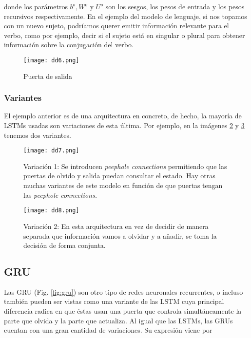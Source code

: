     \noindent donde los parámetros $b^o, W^o$ y $U^o$ son los sesgos, los pesos de entrada y los pesos recursivos respectivamente. En el ejemplo del modelo de lenguaje, si nos topamos con un nuevo sujeto, podríamos querer emitir información relevante para el verbo, como por ejemplo, decir si el sujeto está en singular o plural para obtener información sobre la conjugación del verbo. 

	   \begin{figure}[H]
	      \centering
	      \texttt{[image: dd6.png]}
	      \caption{Puerta de salida}
	      \label{fig:LSTM output gate}
	   \end{figure}
    

    \subsubsection{Variantes}
    

    El ejemplo anterior es de una arquitectura en concreto, de hecho, la mayoría de LSTMs usadas son variaciones de esta última. Por ejemplo, en la imágenes \ref{fig:lstm_v1} y \ref{fig:lstm_v2} tenemos dos variantes. 
	   
	   \begin{figure}[H]
	       \centering
	       \texttt{[image: dd7.png]}
	       \caption{Variación 1: Se introducen \textit{peephole connections} permitiendo que las puertas de olvido y salida puedan consultar el estado. Hay otras muchas variantes de este modelo en función de que puertas tengan las \textit{peephole connections.}}
	       \label{fig:lstm_v1}
	   \end{figure}
	   
	   
	   \begin{figure}[H]
	       \centering
	       \texttt{[image: dd8.png]}
	       \caption{Variación 2: En esta arquitectura en vez de decidir de manera separada que información vamos a olvidar y a añadir, se toma la decisión de forma conjunta.}
	       \label{fig:lstm_v2}
	   \end{figure}
	    
	    
    \subsection{GRU}
    
        Las GRU (Fig. \ref{fig:gru}) \cite{chung2014empirical} son otro tipo de redes neuronales recurrentes, o incluso también pueden ser vistas como una variante de las LSTM cuya principal diferencia radica en que éstas usan una puerta que controla simultáneamente la parte que olvida y la parte que actualiza. Al igual que las LSTMs, las GRUs cuentan con una gran cantidad de variaciones. Su expresión viene por  \\
        

